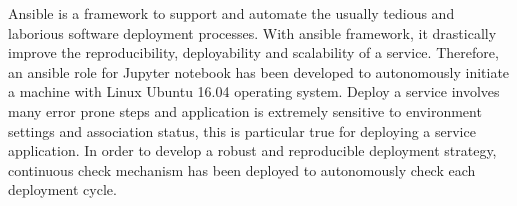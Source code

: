Ansible is a framework to support and automate the usually tedious and laborious software deployment processes. With ansible framework, it drastically improve the reproducibility, deployability and scalability of a service. Therefore, 
an ansible role for Jupyter notebook has been developed to autonomously initiate a machine with Linux Ubuntu 16.04 operating system. 
Deploy a service involves many error prone steps and application is extremely sensitive to environment settings and association status, this is particular true for deploying a service application. In order to develop a robust and reproducible deployment strategy, continuous check mechanism has been deployed to autonomously check each deployment cycle. 